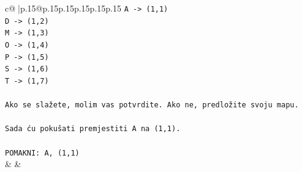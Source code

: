 \documentclass{article}
\begin{document}
{\begin{supertabular}{c@{$\;$}|p{.15\linewidth}@{}p{.15\linewidth}p{.15\linewidth}p{.15\linewidth}p{.15\linewidth}p{.15\linewidth}}
{{{\texttt{A {-}> (1,1)} \\
\texttt{D {-}> (1,2)} \\
\texttt{M {-}> (1,3)} \\
\texttt{O {-}> (1,4)} \\
\texttt{P {-}> (1,5)} \\
\texttt{S {-}> (1,6)} \\
\texttt{T {-}> (1,7)} \\
\\ 
\texttt{Ako se slažete, molim vas potvrdite. Ako ne, predložite svoju mapu.} \\
\\ 
\texttt{Sada ću pokušati premjestiti A na (1,1).} \\
\\ 
\texttt{POMAKNI: A, (1,1)} \\
            }
        }
    }
    & & \\ \\


\end{supertabular}}
\end{document}
